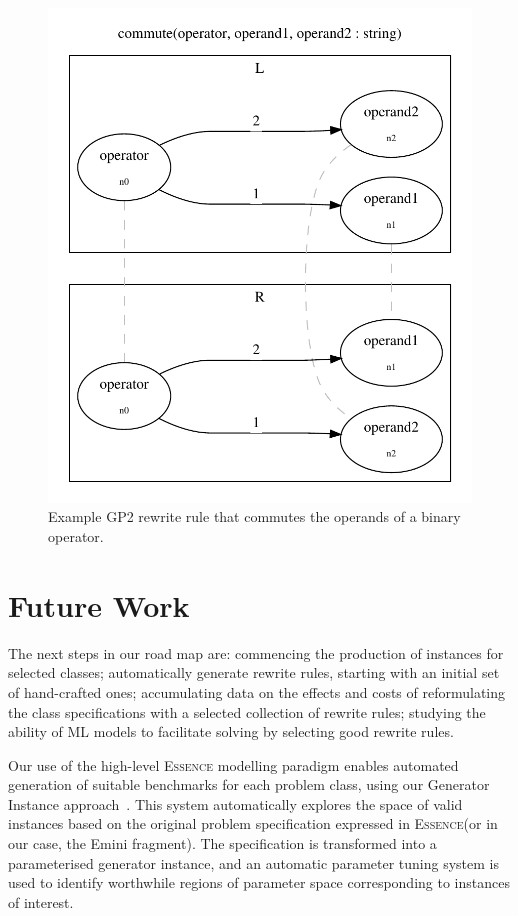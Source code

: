\documentclass[a4paper,UKenglish,cleveref, autoref,pdfa]{lipics-v2021}
\newcommand{\essence}[0]{\textsc{Essence}\xspace}
\begin{document}
\begin{figure}[ht]
\centering
\includegraphics[width=0.65\linewidth]{commute-forvis.pdf}
\caption{Example GP2 rewrite rule that commutes the operands of a binary operator.}
\label{fig:gp2Program}
\end{figure}


\section{Future Work}

The next steps in our road map are: commencing the production of instances for selected classes; automatically generate rewrite rules, starting with an initial set of hand-crafted ones; accumulating data on the effects and costs of reformulating the class specifications with a selected collection of rewrite rules; studying the ability of ML models to facilitate solving by selecting good rewrite rules.

Our use of the high-level \essence modelling paradigm enables automated generation of suitable benchmarks for each problem class, using our Generator Instance approach~\cite{Akgun2019:instance,Akgun2020:discriminating}.
This system automatically explores the space of valid instances based on the original problem specification expressed in \essence (or in our case, the Emini fragment).
The specification is transformed into a parameterised generator instance, and an automatic parameter tuning system is used to identify worthwhile regions of parameter space corresponding to instances of interest.
\end{document}
